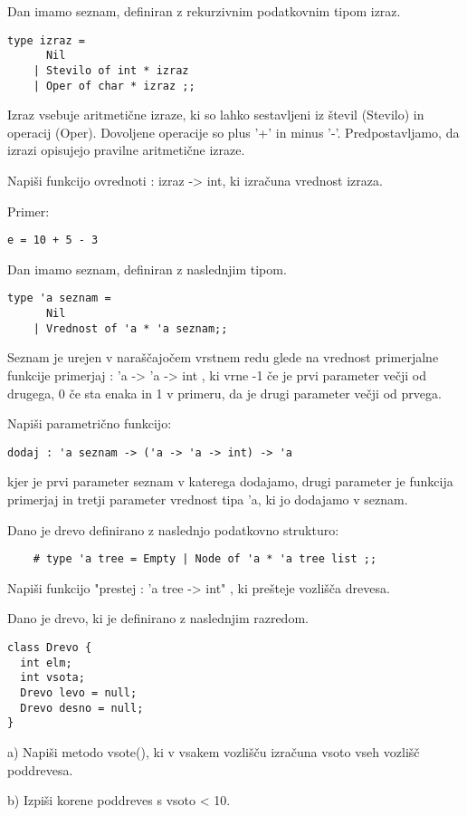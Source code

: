 \begin{ex}
Dan imamo seznam, definiran z rekurzivnim podatkovnim tipom izraz. 
\begin{verbatim}
type izraz = 
      Nil 
    | Stevilo of int * izraz 
    | Oper of char * izraz ;; 
\end{verbatim}
Izraz vsebuje aritmeti\v cne izraze, ki so lahko sestavljeni iz \v stevil (Stevilo) in operacij (Oper). Dovoljene operacije so plus '+' in minus '-'. Predpostavljamo, da izrazi opisujejo pravilne aritmeti\v cne izraze.

Napi\v si funkcijo ovrednoti : izraz -> int, ki izra\v cuna vrednost izraza.

Primer: 
\begin{verbatim} 
e = 10 + 5 - 3
\end{verbatim}


\end{ex}
\begin{ex}
Dan imamo seznam, definiran z naslednjim tipom. 
\begin{verbatim}
type 'a seznam = 
      Nil 
    | Vrednost of 'a * 'a seznam;; 
\end{verbatim}

Seznam je urejen v nara\v s\v cajo\v cem vrstnem redu glede na vrednost primerjalne funkcije primerjaj : 'a -> 'a -> int , ki vrne -1 \v ce je prvi parameter ve\v cji od drugega, 0 \v ce sta enaka in 1 v primeru, da je drugi parameter ve\v cji od prvega.

Napi\v si parametri\v cno funkcijo:
\begin{verbatim}
dodaj : 'a seznam -> ('a -> 'a -> int) -> 'a
\end{verbatim}
kjer je prvi parameter seznam v katerega dodajamo, drugi parameter je funkcija primerjaj in tretji parameter vrednost tipa 'a, ki jo dodajamo v seznam.



\end{ex}
\begin{ex}
Dano je drevo definirano z naslednjo podatkovno strukturo:

\begin{verbatim}
	# type 'a tree = Empty | Node of 'a * 'a tree list ;;
\end{verbatim}
Napi\v si funkcijo "prestej : 'a tree -> int" , ki pre\v steje vozli\v s\v ca drevesa.



\end{ex}
\begin{ex}
Dano je drevo, ki je definirano z naslednjim razredom.

\begin{verbatim}
class Drevo {
  int elm;
  int vsota;
  Drevo levo = null;
  Drevo desno = null;
}
\end{verbatim}

a) Napi\v si metodo vsote(), ki v vsakem vozli\v s\v cu izra\v cuna vsoto vseh vozli\v s\v c poddrevesa.

b) Izpi\v si korene poddreves s vsoto < 10.



\end{ex}
